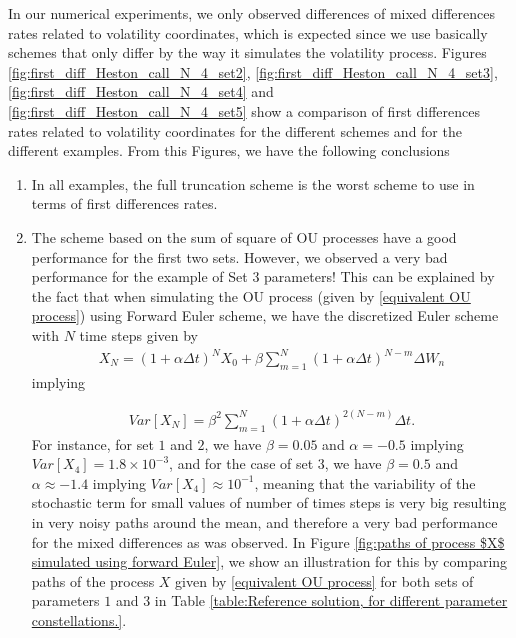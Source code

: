 In our numerical experiments, we only observed differences of mixed differences rates related to volatility coordinates, which is expected since we use basically schemes that only differ by the way it simulates the volatility process. Figures \ref{fig:first_diff_Heston_call_N_4_set2}, \ref{fig:first_diff_Heston_call_N_4_set3}, \ref{fig:first_diff_Heston_call_N_4_set4} and \ref{fig:first_diff_Heston_call_N_4_set5} show a comparison of first differences rates related to volatility coordinates for the different schemes and for the different examples. From this Figures, we have the following conclusions
\begin{enumerate}
\item In all examples, the full truncation scheme is the worst scheme to use in terms of first differences rates.
\item The scheme based on the sum of square of OU processes have a good performance for the first two sets. However, we observed a very bad performance for the example of Set $3$ parameters!  This can be explained by the fact that when simulating the OU process (given by \eqref{equivalent OU process}) using Forward Euler scheme, we have the discretized Euler scheme with $N$ time steps given by
\begin{align*}
X_N=(1+\alpha \Delta t)^N X_0+\beta \sum_{m=1}^N (1+\alpha \Delta t)^{N-m} \Delta W_n
\end{align*}
implying 

\begin{align}
Var[X_N]=\beta^2  \sum_{m=1}^N (1+\alpha \Delta t)^{2(N-m)} \Delta t.
\end{align}
For instance, for set $1$ and $2$, we have $\beta=0.05$ and $\alpha=-0.5$ implying $Var[X_4]=1.8 \times 10^{-3}$, and for the case of set $3$, we have $\beta=0.5$ and $\alpha\approx-1.4$ implying $Var[X_4]\approx   10^{-1}$, meaning that the variability of the stochastic term for small values of number of times steps is very big resulting in very noisy paths around the mean, and therefore a very bad performance for the mixed differences as was observed.  In Figure \ref{fig:paths of process $X$ simulated using forward Euler}, we show an illustration for this by comparing paths of the process $X$ given by \eqref{equivalent OU process} for both sets of parameters $1$ and $3$ in Table \ref{table:Reference solution, for different parameter constellations.}. 


\end{enumerate}
